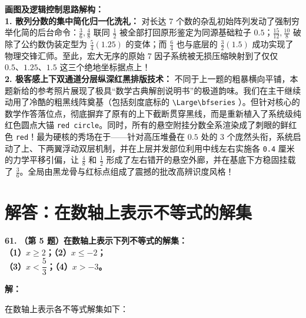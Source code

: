 \vspace{0.4cm}
{\small\color{blue!70!black}
\textbf{画图及逻辑控制思路解构：}\\
\textbf{1. 散列分数的集中简化归一化洗礼：} 对长达 $7$ 个数的杂乱初始阵列发动了强制穷举化简的后台命令：$\frac{3}{6}, \frac{4}{8}$ 联同 $\frac{1}{2}$ 被全部打回原形鉴定为同源基础粒子 $0.5$；$\frac{15}{12}, \frac{10}{8}$ 破除了公约数伪装定型为 $\frac{5}{4} (1.25)$ 的变体；而 $\frac{6}{4}$ 也与底层的 $\frac{3}{2} (1.5)$ 成功实现了物理交锋汇师。至此，宏大无序的原始 $7$ 因子系统被无损压缩映射到了仅仅 $0.5、 1.25、 1.5$ 这三个绝地坐标据点上！\\
\textbf{2. 极客感上下双通道分层纵深红黑排版技术：} 不同于上一题的粗暴横向平铺，本题新给的参考照片展现了极具“数学古典解剖说明书”的极道韵味。我们在主干继续动用了冷酷的粗黑线阵奠基（包括刻度底标的 \texttt{\textbackslash{}Large\textbackslash{}bfseries} ）。但针对核心的数学作答落位点，彻底摒弃了原有的上下截断贯穿黑线，而是重新植入了系统级纯红色圆点大锚 \texttt{red circle}。同时，所有的悬空附挂分数全系渲染成了刺眼的鲜红色 \texttt{red}！最为硬核的秀场在于——针对高压堆叠在 $0.5$ 处的 $3$ 个庞然头衔，系统启动了上、下两翼浮动双层机制，并在上层并发部位利用中线左右实施各 \texttt{0.4} 厘米的力学平移引偏，让 $\frac{4}{8}$ 和 $\frac{1}{2}$ 形成了左右错开的悬空外廊，并在基底下方稳固挂载了 $\frac{3}{6}$。全局由黑龙骨与红标点组成了震撼的批改高辨识度风格！
}

\newpage




\section{解答：在数轴上表示不等式的解集}

\vspace{0.6cm}

\textbf{\LARGE 61.} \textbf{（第 5 题）在数轴上表示下列不等式的解集：\\
（1）$x \geqslant 2$；\qquad\quad （2）$x \leqslant -2$；\\
（3）$x < \dfrac{5}{3}$；\qquad\quad （4）$x > -3$。}

\vspace{0.4cm}
\textbf{解：}

在数轴上表示各不等式解集如下：

\vspace{0.4cm}

